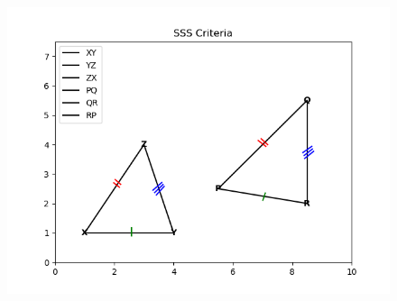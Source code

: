 \documentclass[12pt]{article}
\begin{document}
\begin{enumerate}
\begin{figure}[!h]
  \begin{center} 
      \includegraphics[width=\columnwidth]{./figs/graph3.png}
  \end{center}
\caption{}
\label{fig:Fig3}
\end{figure}
\end{enumerate}
\end{document}
